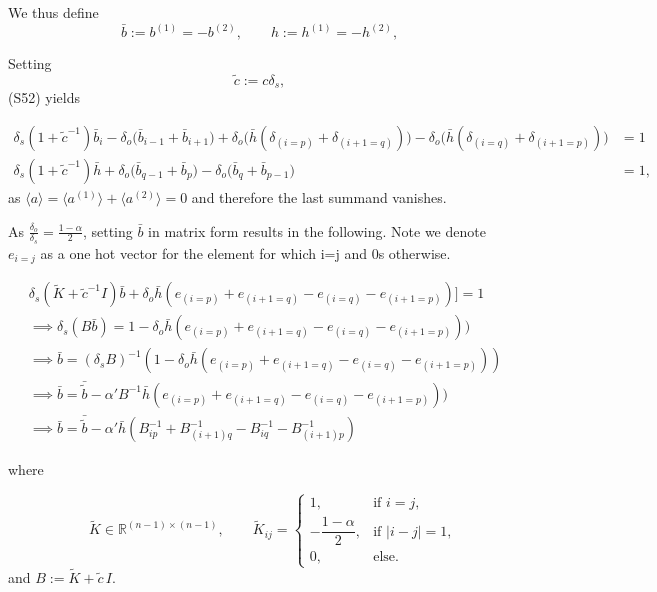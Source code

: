 \documentclass{article}
\theoremstyle{plain}
\begin{document}
We thus define
\begin{equation}
\bar b := b^{(1)} = -b^{(2)}, 
\qquad h := h^{(1)} = -h^{(2)},
\tag{S55}
\end{equation}

Setting
\begin{equation}
\tilde c := c \delta_s,
\tag{S56}
\end{equation}
(S52) yields

\begin{align}
\delta_s(1 + \tilde{c}^{-1}) \bar{b}_i 
- \delta_o\bigl(\bar{b}_{i-1} + \bar{b}_{i+1}\bigr)
+ \delta_o\bigl(\bar{h}(\delta_{(i=p)} + \delta_{(i+1 = q)}) \bigr)
- \delta_o\bigl(\bar{h}(\delta_{(i=q)} + \delta_{(i+1 = p)}) \bigr) &= 1
\nonumber \\
\delta_s(1 + \tilde{c}^{-1}) \bar{h} 
+ \delta_o\bigl(\bar{b}_{q-1} + \bar{b}_p\bigr) 
- \delta_o\bigl(\bar{b}_{q} + \bar{b}_{p-1}\bigr) 
&= 1, 
\tag{S57}
\end{align}
as $\langle a \rangle = \langle a^{(1)} \rangle + \langle a^{(2)} \rangle = 0$ and therefore the last summand vanishes. 

As $\tfrac{\delta_o}{\delta_s} = \tfrac{1-\alpha}{2}$, setting $\bar{b}$ in matrix form results in the following.  Note we denote $e_{i=j}$ as a one hot vector for the element for which i=j and 0s otherwise.

\begin{align}& 
\delta_s(\tilde{K} + \tilde{c}^{-1} I)\bar{b} + \delta_o \bar{h} (e_{(i=p)} + e_{(i+1 = q)} - e_{(i = q)} - e_{(i+1=p)} ) ] = 1 \nonumber \\
& \implies \delta_s 
(B\bar{b}) = 1 - \delta_o \bar{h} (e_{(i=p)} + e_{(i+1 = q)} - e_{(i = q)} - e_{(i+1=p)} ) )
\nonumber \\
&\implies
\bar{b} = (\delta_s B)^{-1} (1 - \delta_o \bar{h} (e_{(i=p)} + e_{(i+1 = q)} - e_{(i = q)} - e_{(i+1=p)} ) ) \nonumber \\ 
&\implies 
\bar{b} = \bar{\tilde{b}} - \alpha' B^{-1} \bar{h} (e_{(i=p)} + e_{(i+1 = q)} - e_{(i = q)} - e_{(i+1=p)} ) ) \nonumber \\
& \implies \bar{b} = \bar{\tilde{b}} - \alpha' \bar{h} (B^{-1}_{ip} + B^{-1}_{(i+1)q} - B^{-1}_{iq} - B^{-1}_{(i+1)p})
\tag{S59}
\end{align}

where 

\[\qquad
\tilde{K} \in \mathbb{R}^{(n-1)\times(n-1)},\qquad
\tilde{K}_{ij} =
\begin{cases}
1, & \text{if } i=j,\\[4pt]
-\dfrac{1-\alpha}{2}, & \text{if } |i-j|=1,\\[6pt]
0, & \text{else.}
\end{cases}
\tag{S60}
\]
and 
$ B := \tilde{K} + \tilde{c}\,I $.
\end{document}
